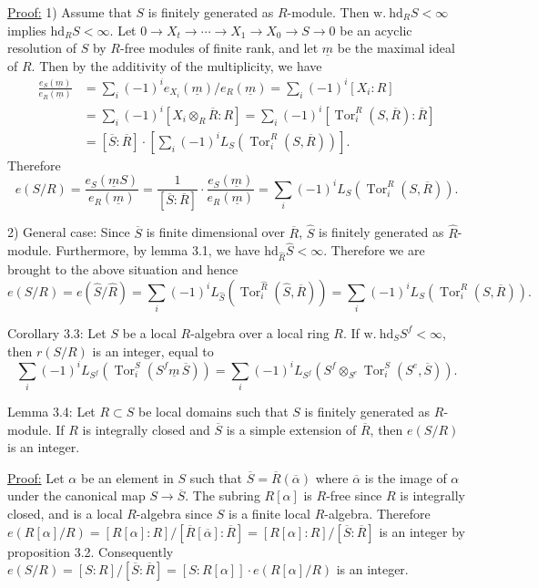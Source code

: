\uline{Proof:} 1) Assume that $S$ is finitely generated as $R$-module. Then $\mathrm{w.\ hd}_R S<\infty$ implies $\mathrm{hd}_R S<\infty$. Let $0\longrightarrow X_t\longrightarrow\cdots\longrightarrow X_1\longrightarrow X_0\longrightarrow S\longrightarrow0$ be an acyclic resolution of $S$ by $R$-free modules of finite rank, and let $\underline m$ be the maximal ideal of $R$. Then by the additivity of the multiplicity, we have
\[
\begin{aligned}
\frac{e_S(\underline m)}{e_R(\underline m)}
&=\sum_i(-1)^i e_{X_i}(\underline m)/e_R(\underline m)=\sum_i(-1)^i[X_i:R]\\
&=\sum_i(-1)^i[X_i\otimes_R\overline R:R]=\sum_i(-1)^i[\operatorname{Tor}_i^R(S,\overline R):\overline R]\\
&=[\overline S:\overline R]\cdot[\sum_i(-1)^iL_S(\operatorname{Tor}_i^R(S,\overline R))].
\end{aligned}
\]
Therefore
\[
e(S/R)=\frac{e_S(\underline m S)}{e_R(\underline m)}=\frac1{[\overline S:\overline R]}\cdot\frac{e_S(\underline m)}{e_R(\underline m)}=\sum_i(-1)^iL_S(\operatorname{Tor}_i^R(S,\overline R)).
\]

2) General case: Since $\overline S$ is finite dimensional over $\overline R$, $\widehat S$ is finitely generated as $\widehat R$-module. Furthermore, by lemma 3.1, we have $\mathrm{hd}_{\widehat R}\widehat S<\infty$. Therefore we are brought to the above situation and hence
\[
e(S/R)=e(\widehat S/\widehat R)=\sum_i(-1)^iL_{\widehat S}(\operatorname{Tor}_i^{\widehat R}(\widehat S,\overline R))=\sum_i(-1)^iL_S(\operatorname{Tor}_i^R(S,\overline R)).
\]

Corollary 3.3: Let $S$ be a local $R$-algebra over a local ring $R$. If $\mathrm{w.\ hd}_S S^f<\infty$, then $r(S/R)$ is an integer, equal to
\[
\sum_i(-1)^iL_{S^f}(\operatorname{Tor}_i^S(S^f\underline m\,\overline S))=\sum_i(-1)^iL_{S^f}(S^f\otimes_{S^e}\operatorname{Tor}_i^S(S^e,\overline S)).
\]

Lemma 3.4: Let $R\subset S$ be local domains such that $S$ is finitely generated as $R$-module. If $R$ is integrally closed and $\overline S$ is a simple extension of $\overline R$, then $e(S/R)$ is an integer.

\uline{Proof:} Let $\alpha$ be an element in $S$ such that $\overline S=\overline R(\overline\alpha)$ where $\overline\alpha$ is the image of $\alpha$ under the canonical map $S\longrightarrow\overline S$. The subring $R[\alpha]$ is $R$-free since $R$ is integrally closed, and is a local $R$-algebra since $S$ is a finite local $R$-algebra. Therefore $e(R[\alpha]/R)=[R[\alpha]:R]/[\overline R[\overline\alpha]:\overline R]=[R[\alpha]:R]/[\overline S:\overline R]$ is an integer by proposition 3.2. Consequently $e(S/R)=[S:R]/[\overline S:\overline R]=[S:R[\alpha]]\cdot e(R[\alpha]/R)$ is an integer.
